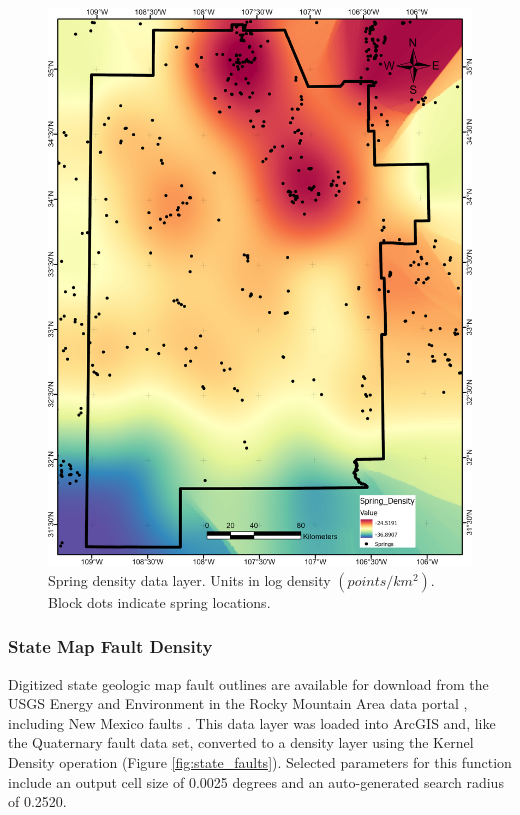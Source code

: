 \begin{figure}[!htp]
\centering
\includegraphics[scale=.50]{templates/images/Figure-SpringDensity.png}
\caption[Spring density data layer]{Spring density data layer. Units in log density \((points/km^2)\). Block dots indicate spring locations.}
\label{fig:feat_spring}
\end{figure}

\subsubsection{State Map Fault Density}

Digitized state geologic map fault outlines are available for download from the USGS Energy and Environment in the Rocky Mountain Area data portal \citep{usgs_eerma_2021}, including New Mexico faults \citep{stoeser_new_2005}. This data layer was loaded into ArcGIS and, like the Quaternary fault data set, converted to a density layer using the Kernel Density operation (Figure \ref{fig:state_faults}). Selected parameters for this function include an output cell size of 0.0025 degrees and an auto-generated search radius of 0.2520.

